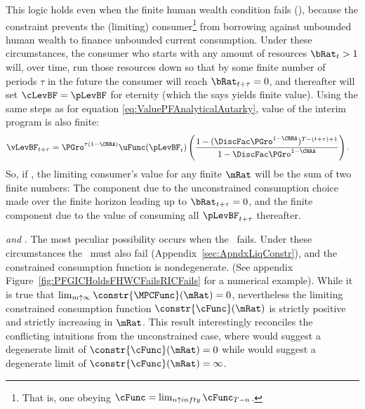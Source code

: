 \documentclass[BufferStockTheory]{subfiles}
\begin{document}
This logic holds even when the finite human wealth condition fails (\cncl{\FHWC}), because the constraint prevents the (limiting) consumer\footnote{That is, one obeying $\cFunc = \lim_{n \uparrow infty} \cFunc_{T-n}$.} from borrowing against unbounded human wealth to finance unbounded current consumption.  Under these circumstances, the consumer who starts with any amount of resources $\bRat_{t} > 1$ will, over time, run those resources down so that by some finite number of periods $\tau$ in the future the consumer will reach $\bRat_{t+\tau} = 0$, and thereafter will set $\cLevBF = \pLevBF$ for eternity (which the {\PFFVAC} says yields finite value).  Using the same steps as for equation \eqref{eq:ValuePFAnalyticalAutarky}, value of the interim program is also finite: \hypertarget{PFFVAC}{} \hypertarget{PFVAF}{}
\begin{align*}
  \vLevBF_{t+\tau} %
 & = \PGro^{\tau(1-\CRRA)} \uFunc(\pLevBF_{t})\left(\frac{1-(\DiscFac
        \PGro^{1-\CRRA})^{T-(t+\tau)+1}}{1-\DiscFac \PGro^{1-\CRRA}}\right).
\end{align*}
So, if \cncl{\FHWC}, the limiting consumer's value for any finite $\mRat$ will be the sum of two finite numbers: The component due to the unconstrained consumption choice made over the finite horizon leading up to $\bRat_{t+\tau} = 0$, and the finite component due to the value of consuming all $\pLevBF_{t+\tau}$ thereafter.
  
\hypertarget{RICandFHWCFail}{}
\textit{{\GICRaw} and {\cncl{\RIC}}}.  
The most peculiar possibility occurs when the \RIC~fails.  Under these circumstances the \FHWC~must also fail (Appendix~\ref{sec:ApndxLiqConstr}), and the constrained consumption function is nondegenerate.  (See appendix Figure~\ref{fig:PFGICHoldsFHWCFailsRICFails} for a numerical example).  While it is true that $\lim_{m \uparrow \infty}
\constr{\MPCFunc}(\mRat) = 0$, nevertheless the limiting constrained
consumption function $\constr{\cFunc}(\mRat)$ is strictly positive
and strictly increasing in $\mRat$.  This result interestingly
reconciles the conflicting intuitions from the unconstrained case,
where \cncl{\RIC} would suggest a degenerate limit of
$\constr{\cFunc}(\mRat)=0$ while \cncl{\FHWC} would suggest a
degenerate limit of $\constr{\cFunc}(\mRat)=\infty$.
\end{document}
